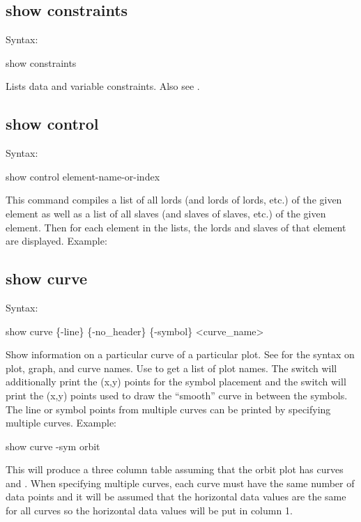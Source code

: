 {{{{{{{{%

\subsection{show constraints}
\label{s:show.constraints}

Syntax:
\begin{example}
  show constraints
\end{example}

Lists data and variable constraints. Also see .


\subsection{show control}
\label{s:show.control}

Syntax:
\begin{example}
  show control {element-name-or-index}
\end{example}

This command compiles a list of all lords (and lords of lords, etc.) of the given element as well as
a list of all slaves (and slaves of slaves, etc.) of the given element. Then for each element in the
lists, the lords and slaves of that element are displayed. Example:


\subsection{show curve}
\label{s:show.curve}

Syntax:
\begin{example}
  show curve \{-line\} \{-no_header\} \{-symbol\} <curve_name>
\end{example}

Show information on a particular curve of a particular plot. See  for the syntax on
plot, graph, and curve names.  Use  to get a list of plot names. The 
switch will additionally print the (x,y) points for the symbol placement and the  switch
will print the (x,y) points used to draw the ``smooth'' curve in between the symbols. The line or
symbol points from multiple curves can be printed by specifying multiple curves. Example:
\begin{example}
  show curve -sym orbit
\end{example}
This will produce a three column table assuming that the orbit plot has curves  and
. When specifying multiple curves, each curve must have the same number of data
points and it will be assumed that the horizontal data values are the same for all curves so the
horizontal data values will be put in column 1.

}}}}}}}}
